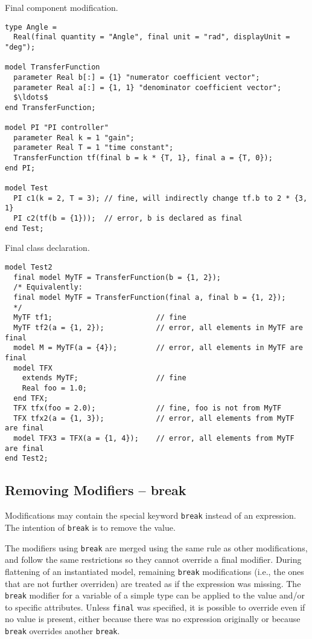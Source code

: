 \begin{example}
Final component modification.
\begin{lstlisting}[language=modelica]
type Angle =
  Real(final quantity = "Angle", final unit = "rad", displayUnit = "deg");

model TransferFunction
  parameter Real b[:] = {1} "numerator coefficient vector";
  parameter Real a[:] = {1, 1} "denominator coefficient vector";
  $\ldots$
end TransferFunction;

model PI "PI controller"
  parameter Real k = 1 "gain";
  parameter Real T = 1 "time constant";
  TransferFunction tf(final b = k * {T, 1}, final a = {T, 0});
end PI;

model Test
  PI c1(k = 2, T = 3); // fine, will indirectly change tf.b to 2 * {3, 1}
  PI c2(tf(b = {1}));  // error, b is declared as final
end Test;
\end{lstlisting}
\end{example}

\begin{example}
Final class declaration.
\begin{lstlisting}[language=modelica]
model Test2
  final model MyTF = TransferFunction(b = {1, 2});
  /* Equivalently:
  final model MyTF = TransferFunction(final a, final b = {1, 2});
  */
  MyTF tf1;                        // fine
  MyTF tf2(a = {1, 2});            // error, all elements in MyTF are final
  model M = MyTF(a = {4});         // error, all elements in MyTF are final
  model TFX
    extends MyTF;                  // fine
    Real foo = 1.0;
  end TFX;
  TFX tfx(foo = 2.0);              // fine, foo is not from MyTF
  TFX tfx2(a = {1, 3});            // error, all elements from MyTF are final
  model TFX3 = TFX(a = {1, 4});    // error, all elements from MyTF are final
end Test2;
\end{lstlisting}
\end{example}

\subsection{Removing Modifiers -- break}\label{removing-modifiers-break}
Modifications may contain the special keyword \lstinline!break! instead of an expression.
The intention of \lstinline!break! is to remove the value.

The modifiers using \lstinline!break! are merged using the same rule as other modifications, and follow the same restrictions so they cannot override a final modifier.
During flattening of an instantiated model, remaining \lstinline!break! modifications (i.e., the ones that are not further overriden) are treated as if the expression was missing.
The \lstinline!break! modifier for a variable of a simple type can be applied to the value and/or to specific attributes.
Unless \lstinline!final! was specified, it is possible to override even if no value is present, either because there was no expression originally or because \lstinline!break! overrides another \lstinline!break!.

